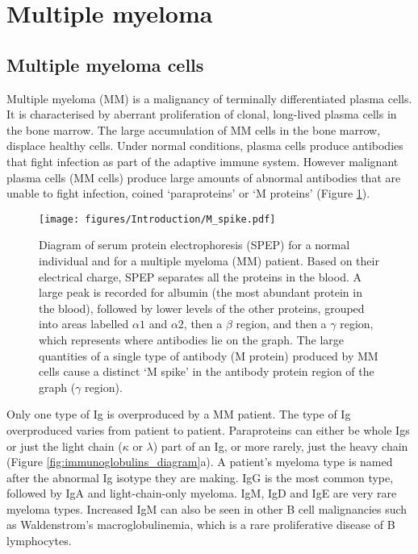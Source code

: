 \section{Multiple myeloma}\label{sec:MM}
\subsection{Multiple myeloma cells}
Multiple myeloma (MM) is a malignancy of terminally differentiated plasma cells.
It is characterised by aberrant proliferation of clonal, long-lived plasma cells in the bone marrow\cite{anderson2011pathogenesis}.
The large accumulation of MM cells in the bone marrow, displace healthy cells.
Under normal conditions, plasma cells produce antibodies that fight infection as part of the adaptive immune system.
However malignant plasma cells (MM cells) produce large amounts of abnormal antibodies that are unable to fight infection, coined `paraproteins' or `M proteins' (Figure \ref{fig:m_spike}).
%
\begin{figure}[htb]
\centering
\texttt{[image: figures/Introduction/M\_spike.pdf]}
\caption[SPEP M spike]{Diagram of serum protein electrophoresis (SPEP) for a normal individual and for a multiple myeloma (MM) patient.
Based on their electrical charge, SPEP separates all the proteins in the blood.
A large peak is recorded for albumin (the most abundant protein in the blood), followed by lower levels of the other proteins, grouped into areas labelled $\alpha1$ and $\alpha2$, then a $\beta$ region, and then a $\gamma$ region, which represents where antibodies lie on the graph.
The large quantities of a single type of antibody (M protein) produced by MM cells cause a distinct `M spike' in the antibody protein region of the graph ($\gamma$ region).}
\label{fig:m_spike}
\end{figure}
Only one type of Ig is overproduced by a MM patient.
The type of Ig overproduced varies from patient to patient.
Paraproteins can either be whole Igs or just the light chain ($\kappa$ or $\lambda$) part of an Ig, or more rarely, just the heavy chain (Figure \ref{fig:immunoglobulins_diagram}a).
A patient's myeloma type is named after the abnormal Ig isotype they are making.
IgG is the most common type, followed by IgA and light-chain-only myeloma.
IgM, IgD and IgE are very rare myeloma types\cite{cancerresearchuktypes}.
Increased IgM can also be seen in other B cell malignancies such as Waldenstrom's macroglobulinemia, which is a rare proliferative disease of B lymphocytes.

